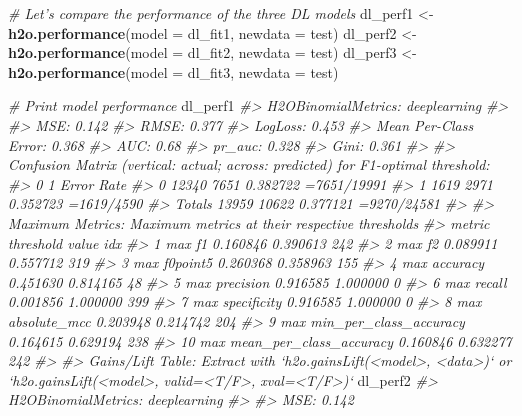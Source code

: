 \documentclass[]{book}
\newenvironment{Shaded}{\begin{snugshade}}{\end{snugshade}}
\newcommand{\CommentTok}[1]{\textcolor[rgb]{0.56,0.35,0.01}{\textit{#1}}}
\newcommand{\DataTypeTok}[1]{\textcolor[rgb]{0.13,0.29,0.53}{#1}}
\newcommand{\KeywordTok}[1]{\textcolor[rgb]{0.13,0.29,0.53}{\textbf{#1}}}
\newcommand{\NormalTok}[1]{#1}
\newcommand{\StringTok}[1]{\textcolor[rgb]{0.31,0.60,0.02}{#1}}
\begin{document}
\begin{Shaded}
\begin{Highlighting}[]
\CommentTok{# Let's compare the performance of the three DL models}
\NormalTok{dl_perf1 <-}\StringTok{ }\KeywordTok{h2o.performance}\NormalTok{(}\DataTypeTok{model =}\NormalTok{ dl_fit1,}
                            \DataTypeTok{newdata =}\NormalTok{ test)}
\NormalTok{dl_perf2 <-}\StringTok{ }\KeywordTok{h2o.performance}\NormalTok{(}\DataTypeTok{model =}\NormalTok{ dl_fit2,}
                            \DataTypeTok{newdata =}\NormalTok{ test)}
\NormalTok{dl_perf3 <-}\StringTok{ }\KeywordTok{h2o.performance}\NormalTok{(}\DataTypeTok{model =}\NormalTok{ dl_fit3,}
                            \DataTypeTok{newdata =}\NormalTok{ test)}

\CommentTok{# Print model performance}
\NormalTok{dl_perf1}
\CommentTok{#> H2OBinomialMetrics: deeplearning}
\CommentTok{#> }
\CommentTok{#> MSE:  0.142}
\CommentTok{#> RMSE:  0.377}
\CommentTok{#> LogLoss:  0.453}
\CommentTok{#> Mean Per-Class Error:  0.368}
\CommentTok{#> AUC:  0.68}
\CommentTok{#> pr_auc:  0.328}
\CommentTok{#> Gini:  0.361}
\CommentTok{#> }
\CommentTok{#> Confusion Matrix (vertical: actual; across: predicted) for F1-optimal threshold:}
\CommentTok{#>            0     1    Error         Rate}
\CommentTok{#> 0      12340  7651 0.382722  =7651/19991}
\CommentTok{#> 1       1619  2971 0.352723   =1619/4590}
\CommentTok{#> Totals 13959 10622 0.377121  =9270/24581}
\CommentTok{#> }
\CommentTok{#> Maximum Metrics: Maximum metrics at their respective thresholds}
\CommentTok{#>                         metric threshold    value idx}
\CommentTok{#> 1                       max f1  0.160846 0.390613 242}
\CommentTok{#> 2                       max f2  0.089911 0.557712 319}
\CommentTok{#> 3                 max f0point5  0.260368 0.358963 155}
\CommentTok{#> 4                 max accuracy  0.451630 0.814165  48}
\CommentTok{#> 5                max precision  0.916585 1.000000   0}
\CommentTok{#> 6                   max recall  0.001856 1.000000 399}
\CommentTok{#> 7              max specificity  0.916585 1.000000   0}
\CommentTok{#> 8             max absolute_mcc  0.203948 0.214742 204}
\CommentTok{#> 9   max min_per_class_accuracy  0.164615 0.629194 238}
\CommentTok{#> 10 max mean_per_class_accuracy  0.160846 0.632277 242}
\CommentTok{#> }
\CommentTok{#> Gains/Lift Table: Extract with `h2o.gainsLift(<model>, <data>)` or `h2o.gainsLift(<model>, valid=<T/F>, xval=<T/F>)`}
\NormalTok{dl_perf2}
\CommentTok{#> H2OBinomialMetrics: deeplearning}
\CommentTok{#> }
\CommentTok{#> MSE:  0.142}

\end{Highlighting}
\end{Shaded}
\end{document}
